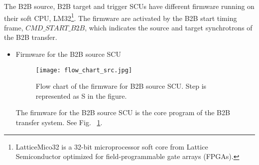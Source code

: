 The B2B source, B2B target and trigger SCUs have different firmware running on their soft \gls{CPU}, LM32\footnote{LatticeMico32 is a 32-bit microprocessor soft core from Lattice Semiconductor optimized for field-programmable gate arrays (\gls{FPGA}s).}. The firmware are activated by the  B2B start timing frame, $CMD\_START\_B2B$, which indicates the source and target synchrotrons of the B2B transfer. 
\begin{itemize}
\item Firmware for the B2B source SCU
\begin{figure}[!htb]
   \centering   
   \texttt{[image: flow\_chart\_src.jpg]}
   \caption{Flow chart of the firmware for B2B source SCU. Step is represented as S in the figure.}
   \label{flow_chart_src}
\end{figure}

The firmware for the B2B source SCU is the core program of the B2B transfer system. See Fig. ~\ref{flow_chart_src}. 


\end{itemize}
